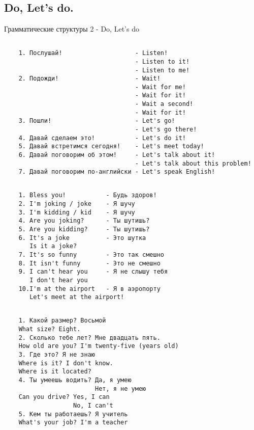 \subsection{Do, Let's do.}
Грамматические структуры 2 - Do, Let's do
\subsection*{}
\begin{verbatim}
    1. Послушай!                    - Listen!
                                    - Listen to it!
                                    - Listen to me!
    2. Подожди!                     - Wait!
                                    - Wait for me!
                                    - Wait for it!
                                    - Wait a second!
                                    - Wait for it!
    3. Пошли!                       - Let's go!
                                    - Let's go there!
    4. Давай сделаем это!           - Let's do it!
    5. Давай встретимся сегодня!    - Let's meet today!
    6. Давай поговорим об этом!     - Let's talk about it!
                                    - Let's talk about this problem!
    7. Давай поговорим по-английски - Let's speak English!
\end{verbatim}

\subsection*{}
\begin{verbatim}
    1. Bless you!           - Будь здоров!
    2. I'm joking / joke    - Я шучу
    3. I'm kidding / kid    - Я шучу
    4. Are you joking?      - Ты шутишь?
    5. Are you kidding?     - Ты шутишь?
    6. It's a joke          - Это шутка
       Is it a joke?
    7. It's so funny        - Это так смешно
    8. It isn't funny       - Это не смешно
    9. I can't hear you     - Я не слышу тебя
       I don't hear you
    10.I'm at the airport   - Я в аэропорту
       Let's meet at the airport!
\end{verbatim}

\subsection*{}
\begin{verbatim}
    1. Какой размер? Восьмой
    What size? Eight.
    2. Сколько тебе лет? Мне двадцать пять.
    How old are you? I'm twenty-five (years old)
    3. Где это? Я не знаю
    Where is it? I don't know.
    Where is it located?
    4. Ты умеешь водить? Да, я умею
                         Нет, я не умею
    Can you drive? Yes, I can
                   No, I can't
    5. Кем ты работаешь? Я учитель
    What's your job? I'm a teacher
\end{verbatim}

